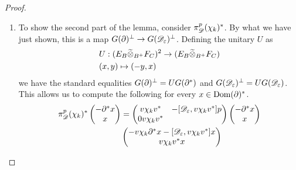 \begin{proof}
\begin{enumerate}
	\item
	To show the second part of the lemma, consider $\pi_{\mathscr{D}}^p(\chi_k)^*$. By what we have just shown, this is a map $G(\partial)^\perp \to G(\mathscr{D}_\varepsilon)^\perp$. Defining the unitary $U$ as 
	\begin{align*}
		&U:(E_B \widetilde{\otimes}_{B^+} F_C)^2\to (E_B \widetilde{\otimes}_{B^+} F_C) \\
		&(x,y)\mapsto (-y,x)
	\end{align*}
	we have the standard equalities $G(\partial)^\perp=UG(\partial^*)$ and $G(\mathscr{D}_\varepsilon)^\perp=UG(\mathscr{D}_\varepsilon)$. This allows us to compute the following for every $x\in \operatorname{Dom} (\partial)^*$. 
	\begin{align*}
		\pi_\D^p(\chi_k)^*\begin{pmatrix} -\part^* x \\ x \end{pmatrix}&=\begin{pmatrix} v\chi_k v^* & -[\D_\epsilon,v\chi_k v^*]p \\ 0 v\chi_k v^* \end{pmatrix}\begin{pmatrix}-\part^* x \\ x \end{pmatrix} \\
		&\begin{pmatrix} -v\chi_k\part^* x -[\D_\epsilon,v\chi_k v^* ]x\\ v\chi_k v^* x \end{pmatrix}

\end{align*}
\end{enumerate}
\end{proof}

